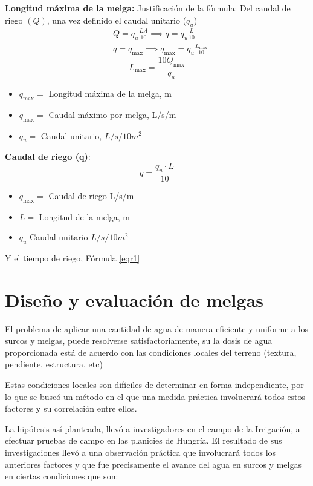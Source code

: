 \textbf{Longitud máxima de la melga:}
Justificación de la fórmula: Del caudal de riego $(Q)$, una vez definido el caudal unitario ($q_u$)
\begin{align*}
    &Q= q_u\frac{LA}{10}\implies q= q_u\frac{L}{10}\\
    &q=q_{\max}\implies q_{\max}= q_u\frac{L_{\max}}{10}
\end{align*}
\begin{equation}
    L_{\max} = \frac{10Q_{\max}}{q_u}
\end{equation}
\begin{notation}
    \begin{itemize}
        \item $q_{\max}=$ Longitud máxima de la melga, m
        \item $q_{\max}=$ Caudal máximo por melga, L/s/m
        \item $q_u=$ Caudal unitario, $L/s/10m^2$
    \end{itemize}
\end{notation}
\textbf{Caudal de riego (q)}:
\begin{equation}
    q= \frac{q_u\cdot L}{10}
\end{equation}

\begin{notation}
    \begin{itemize}
        \item $q_{\max}=$ Caudal de riego L/s/m
        \item $L=$ Longitud de la melga, m
        \item $q_u$ Caudal unitario $L/s/10m^2$
    \end{itemize}
\end{notation}
Y el tiempo de riego, Fórmula \eqref{eqr1}
\section{Diseño y evaluación de melgas}
El problema de aplicar una cantidad de agua de manera eficiente y uniforme a los surcos y melgas, puede resolverse satisfactoriamente, su la dosis de agua proporcionada está de acuerdo con las condiciones locales del terreno (textura, pendiente, estructura, etc)

Estas condiciones locales son difíciles de determinar en forma independiente, por lo que se buscó un método en el que una medida práctica involucrará todos estos factores y su correlación entre ellos.

La hipótesis así planteada, llevó a investigadores en el campo de la Irrigación, a efectuar pruebas de campo en las planicies de Hungría. El resultado de sus investigaciones llevó a una observación práctica que involucrará todos los anteriores factores y que fue precisamente el avance del agua en surcos y melgas en ciertas condiciones que son:

